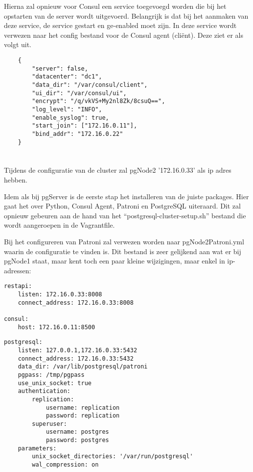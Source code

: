 Hierna zal opnieuw voor Consul een service toegevoegd worden die bij het opstarten van de server wordt uitgevoerd. Belangrijk is dat bij het aanmaken van deze service, de service gestart en ge-enabled moet zijn. In deze service wordt verwezen naar het config bestand voor de Consul agent (cliënt). Deze ziet er als volgt uit.

\begin{lstlisting}
    {
        "server": false,
        "datacenter": "dc1",
        "data_dir": "/var/consul/client",
        "ui_dir": "/var/consul/ui",
        "encrypt": "/q/vkVS+My2nl8Zk/8csuQ==", 
        "log_level": "INFO",
        "enable_syslog": true,
        "start_join": ["172.16.0.11"],
        "bind_addr": "172.16.0.22"
    }  
\end{lstlisting}


\section{}
\label{sec:pgNode2}
Tijdens de configuratie van de cluster zal pgNode2 '172.16.0.33' als ip adres hebben.

Idem als bij pgServer is de eerste stap het installeren van de juiste packages. Hier gaat het over Python, Consul Agent, Patroni en PostgreSQL uiteraard. Dit zal opnieuw gebeuren aan de hand van het “postgresql-cluster-setup.sh” bestand die wordt aangeroepen in de Vagrantfile.

Bij het configureren van Patroni zal verwezen worden naar pgNode2Patroni.yml waarin de configuratie te vinden is. Dit bestand is zeer gelijkend aan wat er bij pgNode1 staat, maar kent toch een paar kleine wijzigingen, maar enkel in ip-adressen:

\begin{lstlisting}
restapi:
    listen: 172.16.0.33:8008
    connect_address: 172.16.0.33:8008

consul:
    host: 172.16.0.11:8500
\end{lstlisting}

\begin{lstlisting}
postgresql:
    listen: 127.0.0.1,172.16.0.33:5432
    connect_address: 172.16.0.33:5432
    data_dir: /var/lib/postgresql/patroni
    pgpass: /tmp/pgpass
    use_unix_socket: true
    authentication:
        replication:
            username: replication
            password: replication
        superuser:
            username: postgres
            password: postgres
    parameters:
        unix_socket_directories: '/var/run/postgresql'
        wal_compression: on
\end{lstlisting}


